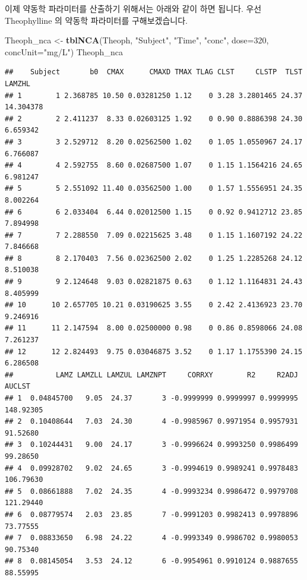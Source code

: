 \documentclass[
  12pt,
]{krantz}
\newenvironment{Shaded}{\begin{snugshade}}{\end{snugshade}}
\newcommand{\DataTypeTok}[1]{\textcolor[rgb]{0.13,0.29,0.53}{#1}}
\newcommand{\DecValTok}[1]{\textcolor[rgb]{0.00,0.00,0.81}{#1}}
\newcommand{\KeywordTok}[1]{\textcolor[rgb]{0.13,0.29,0.53}{\textbf{#1}}}
\newcommand{\NormalTok}[1]{#1}
\newcommand{\StringTok}[1]{\textcolor[rgb]{0.31,0.60,0.02}{#1}}
\begin{document}
이제 약동학 파라미터를 산출하기 위해서는 아래와 같이 하면 됩니다.
우선 Theophylline 의 약동학 파라미터를 구해보겠습니다.

\begin{Shaded}
\begin{Highlighting}[]
\NormalTok{Theoph\_nca \textless{}{-}}\StringTok{ }\KeywordTok{tblNCA}\NormalTok{(Theoph, }\StringTok{"Subject"}\NormalTok{, }\StringTok{"Time"}\NormalTok{, }\StringTok{"conc"}\NormalTok{, }
                     \DataTypeTok{dose=}\DecValTok{320}\NormalTok{, }\DataTypeTok{concUnit=}\StringTok{"mg/L"}\NormalTok{)}
\NormalTok{Theoph\_nca}
\end{Highlighting}
\end{Shaded}

\begin{verbatim}
##    Subject       b0  CMAX      CMAXD TMAX TLAG CLST     CLSTP  TLST    LAMZHL
## 1        1 2.368785 10.50 0.03281250 1.12    0 3.28 3.2801465 24.37 14.304378
## 2        2 2.411237  8.33 0.02603125 1.92    0 0.90 0.8886398 24.30  6.659342
## 3        3 2.529712  8.20 0.02562500 1.02    0 1.05 1.0550967 24.17  6.766087
## 4        4 2.592755  8.60 0.02687500 1.07    0 1.15 1.1564216 24.65  6.981247
## 5        5 2.551092 11.40 0.03562500 1.00    0 1.57 1.5556951 24.35  8.002264
## 6        6 2.033404  6.44 0.02012500 1.15    0 0.92 0.9412712 23.85  7.894998
## 7        7 2.288550  7.09 0.02215625 3.48    0 1.15 1.1607192 24.22  7.846668
## 8        8 2.170403  7.56 0.02362500 2.02    0 1.25 1.2285268 24.12  8.510038
## 9        9 2.124648  9.03 0.02821875 0.63    0 1.12 1.1164831 24.43  8.405999
## 10      10 2.657705 10.21 0.03190625 3.55    0 2.42 2.4136923 23.70  9.246916
## 11      11 2.147594  8.00 0.02500000 0.98    0 0.86 0.8598066 24.08  7.261237
## 12      12 2.824493  9.75 0.03046875 3.52    0 1.17 1.1755390 24.15  6.286508
##          LAMZ LAMZLL LAMZUL LAMZNPT     CORRXY        R2     R2ADJ    AUCLST
## 1  0.04845700   9.05  24.37       3 -0.9999999 0.9999997 0.9999995 148.92305
## 2  0.10408644   7.03  24.30       4 -0.9985967 0.9971954 0.9957931  91.52680
## 3  0.10244431   9.00  24.17       3 -0.9996624 0.9993250 0.9986499  99.28650
## 4  0.09928702   9.02  24.65       3 -0.9994619 0.9989241 0.9978483 106.79630
## 5  0.08661888   7.02  24.35       4 -0.9993234 0.9986472 0.9979708 121.29440
## 6  0.08779574   2.03  23.85       7 -0.9991203 0.9982413 0.9978896  73.77555
## 7  0.08833650   6.98  24.22       4 -0.9993349 0.9986702 0.9980053  90.75340
## 8  0.08145054   3.53  24.12       6 -0.9954961 0.9910124 0.9887655  88.55995

\end{verbatim}
\end{document}
